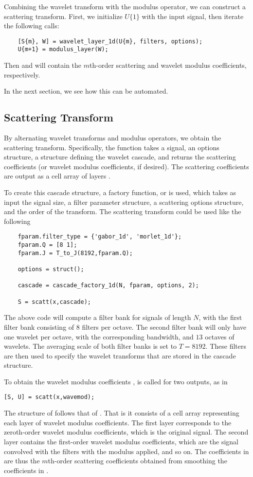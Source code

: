 \documentclass[twocolumn]{article}
\begin{document}
Combining the wavelet transform with the modulus operator, we can construct a scattering transform. First, we initialize $U\{1\}$ with the input signal, then iterate the following calls:
\begin{lstlisting}
	[S{m}, W] = wavelet_layer_1d(U{m}, filters, options);
	U{m+1} = modulus_layer(W);
\end{lstlisting}
Then  and  will contain the $m$th-order scattering and wavelet modulus coefficients, respectively.

In the next section, we see how this can be automated.

\subsection{Scattering Transform}

By alternating wavelet transforms and modulus operators, we obtain the scattering transform. Specifically, the  function takes a signal, an options structure, a structure defining the wavelet cascade, and returns the scattering coefficients (or wavelet modulus coefficients, if desired). The scattering coefficients are output as a cell array of layers .

To create this cascade structure, a factory function,  or  is used, which takes as input the signal size, a filter parameter structure, a scattering options structure, and the order of the transform. The scattering transform could be used like the following
\begin{lstlisting}
	fparam.filter_type = {'gabor_1d', 'morlet_1d'};
	fparam.Q = [8 1];
	fparam.J = T_to_J(8192,fparam.Q);
	
	options = struct();
	
	cascade = cascade_factory_1d(N, fparam, options, 2);
	
	S = scatt(x,cascade);
\end{lstlisting}
The above code will compute a filter bank for signals of length $N$, with the first filter bank consisting of $8$ filters per octave. The second filter bank will only have one wavelet per octave, with the corresponding bandwidth, and $13$ octaves of wavelets. The averaging scale of both filter banks is set to $T = 8192$. These filters are then used to specify the wavelet transforms that are stored in the cascade structure.

To obtain the wavelet modulus coefficients ,  is called for two outputs, as in
\begin{lstlisting}
[S, U] = scatt(x,wavemod);
\end{lstlisting}
The structure of  follows that of . That is it consists of a cell array representing each layer of wavelet modulus coefficients. The first layer corresponds to the zeroth-order wavelet modulus coefficients, which is the original signal. The second layer contains the first-order wavelet modulus coefficients, which are the signal convolved with the filters with the modulus applied, and so on. The coefficients in  are thus the $m$th-order scattering coefficients obtained from smoothing the coefficients in .
\end{document}
